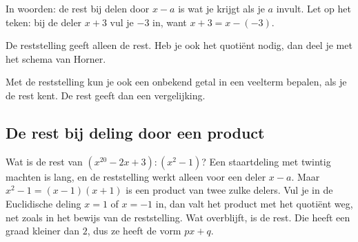 In woorden: de rest bij delen door $x - a$ is wat je krijgt als je $a$ invult. Let op het teken: bij de deler $x + 3$ vul je $-3$ in, want $x + 3 = x - (-3)$.


De reststelling geeft alleen de rest. Heb je ook het quotiënt nodig, dan deel je met het schema van Horner.

\begin{oefeningen}
\end{oefeningen}

Met de reststelling kun je ook een onbekend getal in een veelterm bepalen, als je de rest kent. De rest geeft dan een vergelijking.


\begin{oefeningen}
\end{oefeningen}

\subsection{De rest bij deling door een product}

Wat is de rest van $(x^{20} - 2x + 3) : (x^2 - 1)$? Een staartdeling met twintig machten is lang, en de reststelling werkt alleen voor een deler $x - a$. Maar $x^2 - 1 = (x - 1)(x + 1)$ is een product van twee zulke delers. Vul je in de Euclidische deling $x = 1$ of $x = -1$ in, dan valt het product met het quotiënt weg, net zoals in het bewijs van de reststelling. Wat overblijft, is de rest. Die heeft een graad kleiner dan $2$, dus ze heeft de vorm $px + q$.

